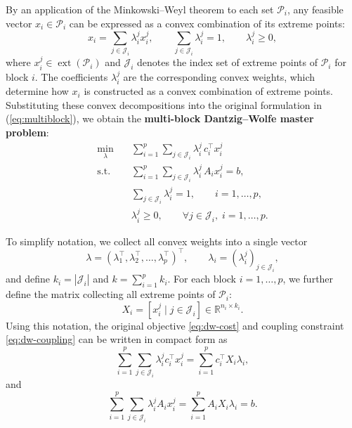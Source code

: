 \documentclass{book}
\theoremstyle{definition}
\numberwithin{algorithm_}{chapter}
\begin{document}
By an application of the Minkowski--Weyl theorem to each set $\mathcal{P}_i$, any feasible vector $x_i \in \mathcal{P}_i$ can be expressed as a convex combination of its extreme points:
\begin{equation}
x_i = \sum_{j \in \mathcal{J}_i} \lambda_i^j x_i^j, 
\qquad 
\sum_{j \in \mathcal{J}_i} \lambda_i^j = 1,
\qquad 
\lambda_i^j \ge 0,
\end{equation}
where $x_i^j \in \operatorname{ext}(\mathcal{P}_i)$ and $\mathcal{J}_i$ denotes the index set of extreme points of $\mathcal{P}_i$ for block $i$. The coefficients $\lambda_i^j$ are the corresponding convex weights, which determine how $x_i$ is constructed as a convex combination of extreme points.
Substituting these convex decompositions into the original formulation in (\ref{eq:multiblock}), we obtain the \textbf{multi-block Dantzig--Wolfe master problem}:
\begin{subequations}\label{eq:multiblock-dw}
\begin{align}
\min_{\lambda} \quad 
& \sum_{i=1}^p \sum_{j \in \mathcal{J}_i} \lambda_i^j \, c_i^\top x_i^j \label{eq:dw-cost}  \\ 
\text{s.t.} \quad 
& \sum_{i=1}^p \sum_{j \in \mathcal{J}_i} \lambda_i^j \, A_i x_i^j = b,
\label{eq:dw-coupling} \\ 
& \sum_{j \in \mathcal{J}_i} \lambda_i^j = 1, \qquad i=1,\dots,p,
\label{eq:dw-convexity} \\ 
& \lambda_i^j \ge 0, \qquad \forall j \in \mathcal{J}_i,\; i=1,\dots,p.
\label{eq:dw-nonnegativity}
\end{align}
\end{subequations}

To simplify notation, we collect all convex weights into a single vector
\[
\lambda = (\lambda_1^\top, \lambda_2^\top, \dots, \lambda_p^\top)^\top,
\qquad 
\lambda_i = (\lambda_i^j)_{j \in \mathcal{J}_i},
\]
and define $k_i = |\mathcal{J}_i|$ and $k = \sum_{i=1}^p k_i$.
For each block $i = 1,\dots,p$, we further define the matrix collecting all extreme points of $\mathcal{P}_i$:
\[
X_i = \left[ x_i^j \mid j \in \mathcal{J}_i \right] \in \mathbb{R}^{n_i \times k_i}.
\]
Using this notation, the original objective \eqref{eq:dw-cost} and coupling constraint \eqref{eq:dw-coupling} can be written in compact form as
\[
\sum_{i=1}^p \sum_{j \in \mathcal{J}_i} \lambda_i^j c_i^\top x_i^j
= \sum_{i=1}^p c_i^\top X_i \lambda_i,
\]
and
\[
\sum_{i=1}^p \sum_{j \in \mathcal{J}_i} \lambda_i^j A_i x_i^j
= \sum_{i=1}^p A_i X_i \lambda_i = b.
\]
\end{document}
